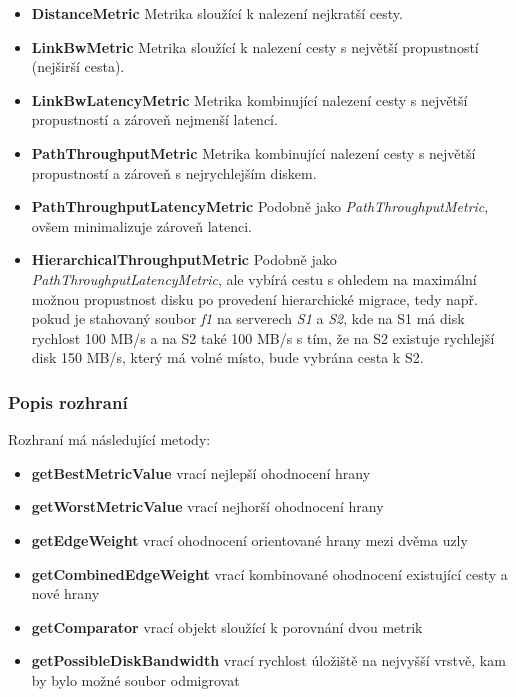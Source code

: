 \documentclass[czech,DP]{thesiskiv}
\begin{document}
\begin{itemize}

\item \textbf{DistanceMetric} Metrika sloužící k nalezení nejkratší cesty.

\item \textbf{LinkBwMetric} Metrika sloužící k nalezení cesty s největší propustností (nejširší cesta).

\item \textbf{LinkBwLatencyMetric} Metrika kombinující nalezení cesty s největší propustností a zároveň nejmenší latencí.

\item \textbf{PathThroughputMetric} Metrika kombinující nalezení cesty s největší propustností a zároveň s nejrychlejším diskem.

\item \textbf{PathThroughputLatencyMetric} Podobně jako \textit{PathThroughputMetric}, ovšem minimalizuje zároveň latenci.

\item \textbf{HierarchicalThroughputMetric} Podobně jako \textit{PathThroughputLatencyMetric}, ale vybírá cestu s ohledem na maximální možnou propustnost disku po provedení hierarchické migrace, tedy např. pokud je stahovaný soubor \textit{f1} na serverech \textit{S1} a \textit{S2}, kde na S1 má disk rychlost 100 MB/s a na S2 také 100 MB/s s tím, že na S2 existuje rychlejší disk 150 MB/s, který má volné místo, bude vybrána cesta k S2.

\end{itemize}

\subsubsection*{Popis rozhraní}

Rozhraní má následující metody:

\begin{itemize}

\item \textbf{getBestMetricValue} vrací nejlepší ohodnocení hrany
\item \textbf{getWorstMetricValue} vrací nejhorší ohodnocení hrany
\item \textbf{getEdgeWeight} vrací ohodnocení orientované hrany mezi dvěma uzly
\item \textbf{getCombinedEdgeWeight} vrací kombinované ohodnocení existující cesty a nové hrany
\item \textbf{getComparator} vrací objekt sloužící k porovnání dvou metrik
\item \textbf{getPossibleDiskBandwidth} vrací rychlost úložiště na nejvyšší vrstvě, kam by bylo možné soubor odmigrovat

\end{itemize}
\end{document}
